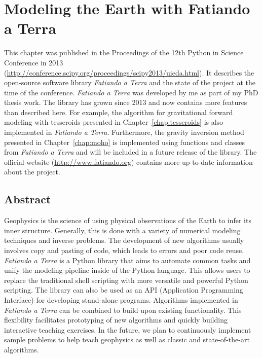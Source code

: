 \chapter{Modeling the Earth with Fatiando a Terra}
\label{chap:fatiando}


This chapter was published in the Proceedings of the 12th Python in Science
Conference in 2013
(\url{http://conference.scipy.org/proceedings/scipy2013/uieda.html}).  It
describes the open-source software library \textit{Fatiando a Terra} and the
state of the project at the time of the conference.  \textit{Fatiando a Terra}
was developed by me as part of my PhD thesis work.  The library has grown since
2013 and now contains more features than described here.  For example, the
algorithm for gravitational forward modeling with tesseroids presented in
Chapter~\ref{chap:tesseroids} is also implemented in \textit{Fatiando a Terra}.
Furthermore, the gravity inversion method presented in Chapter~\ref{chap:moho}
is implemented using functions and classes from \textit{Fatiando a Terra} and
will be included in a future release of the library.  The official website
(\url{http://www.fatiando.org}) contains more up-to-date information about the
project.



\section{Abstract}

Geophysics is the science of using physical observations of the Earth to infer
its inner structure. Generally, this is done with a variety of numerical
modeling techniques and inverse problems. The development of new algorithms
usually involves copy and pasting of code, which leads to errors and poor code
reuse. \textit{Fatiando a Terra} is a Python library that aims to automate common tasks
and unify the modeling pipeline inside of the Python language. This allows
users to replace the traditional shell scripting with more versatile and
powerful Python scripting. The library can also be used as an API (Application
Programming Interface) for developing stand-alone programs.  Algorithms
implemented in \textit{Fatiando a Terra} can be combined to build upon existing
functionality. This flexibility facilitates prototyping of new algorithms and
quickly building interactive teaching exercises. In the future, we plan to
continuously implement sample problems to help teach geophysics as well as
classic and state-of-the-art algorithms.




